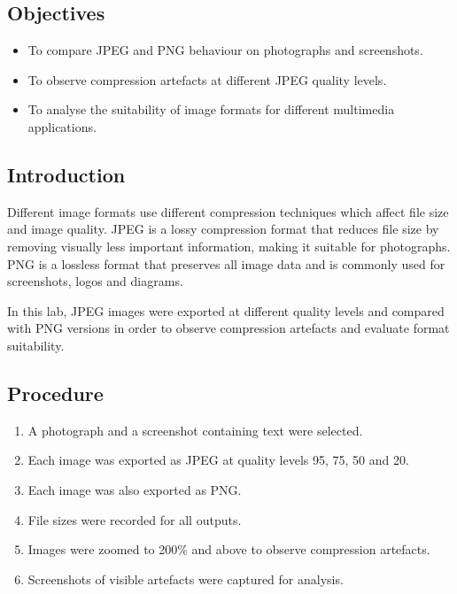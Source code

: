 \documentclass[12pt,a4paper]{article}
\begin{document}
\subsection{Objectives}

\begin{itemize}
    \item To compare JPEG and PNG behaviour on photographs and screenshots.
    \item To observe compression artefacts at different JPEG quality levels.
    \item To analyse the suitability of image formats for different multimedia applications.
\end{itemize}

\subsection{Introduction}

Different image formats use different compression techniques which affect file size and image quality. JPEG is a lossy compression format that reduces file size by removing visually less important information, making it suitable for photographs. PNG is a lossless format that preserves all image data and is commonly used for screenshots, logos and diagrams.

In this lab, JPEG images were exported at different quality levels and compared with PNG versions in order to observe compression artefacts and evaluate format suitability.

\subsection{Procedure}

\begin{enumerate}
    \item A photograph and a screenshot containing text were selected.
    \item Each image was exported as JPEG at quality levels 95, 75, 50 and 20.
    \item Each image was also exported as PNG.
    \item File sizes were recorded for all outputs.
    \item Images were zoomed to 200\% and above to observe compression artefacts.
    \item Screenshots of visible artefacts were captured for analysis.
\end{enumerate}
\end{document}
